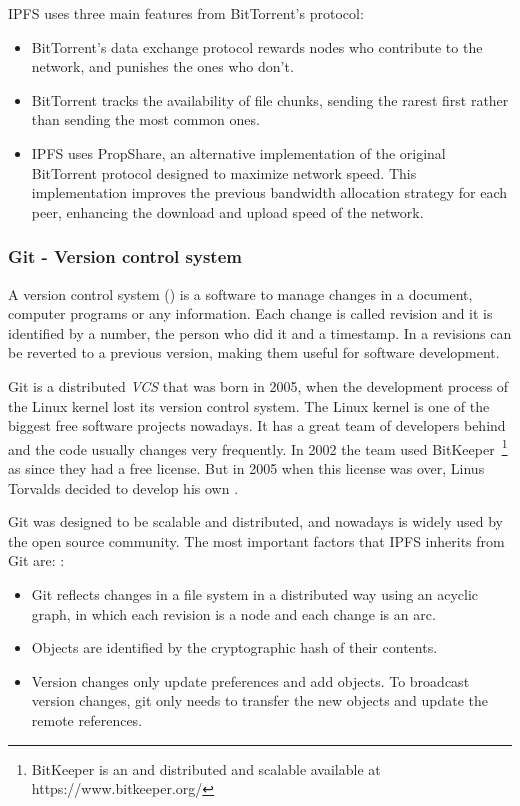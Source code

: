 IPFS uses three main features from BitTorrent's protocol\cite{benet2014ipfs}:
\begin{itemize}
\item BitTorrent's data exchange protocol rewards nodes who contribute to the
  network, and punishes the ones who don't.
\item BitTorrent tracks the availability of file chunks, sending the rarest
  first rather than sending the most common ones.
\item IPFS uses PropShare\cite{levin2008bittorrent}, an alternative
  implementation of the original BitTorrent protocol designed to maximize
  network speed. This implementation improves the previous bandwidth allocation
  strategy for each peer, enhancing the download and upload speed of the
  network.
\end{itemize}

\subsubsection*{Git - Version control system}
\label{tech:sec:ipfs:git}

A version control system () is a software to manage changes in a
document, computer programs or any information. Each change is called revision
and it is identified by a number, the person who did it and a timestamp. In a
 revisions can be reverted to a previous version, making them useful for
software development.

Git is a distributed \emph{VCS}\cite{torvalds2010git} that was born in 2005,
when the development process of the Linux kernel lost its version control
system. The Linux kernel is one of the biggest free software projects nowadays.
It has a great team of developers behind and the code usually changes very
frequently. In 2002 the team used BitKeeper~\footnote{BitKeeper is an and
  distributed and scalable  available at https://www.bitkeeper.org/} as
 since they had a free license. But in 2005 when this license was over,
Linus Torvalds decided to develop his own \cite{spinellis2005version}.

Git was designed to be scalable and distributed, and nowadays is widely used by
the open source community. The most important factors that IPFS inherits from
Git are: \cite{benet2014ipfs}:

\begin{itemize}
\item Git reflects changes in a file system in a distributed way using an
  acyclic graph, in which each revision is a node and each change is an arc.
\item Objects are identified by the cryptographic hash of their contents.
\item Version changes only update preferences and add objects. To broadcast
  version changes, git only needs to transfer the new objects and update the
  remote references.
\end{itemize}

